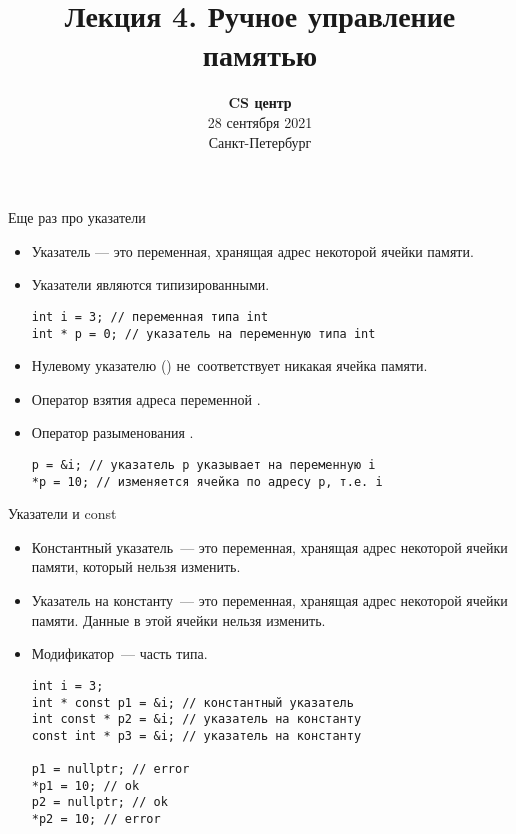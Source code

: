 \documentclass{beamer}
\title{Лекция 4. Ручное управление памятью}
\date{
   \textbf{CS центр}\\
   28 сентября 2021 \\
   Санкт-Петербург
}
\begin{document}
\begin{frame} 
  \titlepage
\end{frame}

\begin{frame}[fragile]{Еще раз про указатели}
    \begin{itemize}
        \item Указатель — это переменная, хранящая адрес некоторой 
            ячейки памяти.
        \item Указатели являются типизированными.
\begin{lstlisting}
int i = 3; // переменная типа int
int * p = 0; // указатель на переменную типа int
\end{lstlisting}
        \item Нулевому указателю () не~соответствует никакая ячейка памяти.
        \item Оператор взятия адреса переменной \code{\&}.
        \item Оператор разыменования \code{*}.

\begin{lstlisting}
p = &i; // указатель p указывает на переменную i
*p = 10; // изменяется ячейка по адресу p, т.е. i
\end{lstlisting}
    \end{itemize}
\end{frame}

\begin{frame}[fragile]{Указатели и const}
    \begin{itemize}
        \item Константный указатель~--- это переменная, хранящая адрес некоторой 
            ячейки памяти, который нельзя изменить.
        \item Указатель на константу~--- это переменная, хранящая адрес некоторой 
            ячейки памяти. Данные в этой ячейки нельзя изменить.
        \item Модификатор~--- часть типа.
\begin{lstlisting}
int i = 3;
int * const p1 = &i; // константный указатель
int const * p2 = &i; // указатель на константу
const int * p3 = &i; // указатель на константу

p1 = nullptr; // error
*p1 = 10; // ok
p2 = nullptr; // ok
*p2 = 10; // error
\end{lstlisting}
    \end{itemize}
\end{frame}
\end{document}
